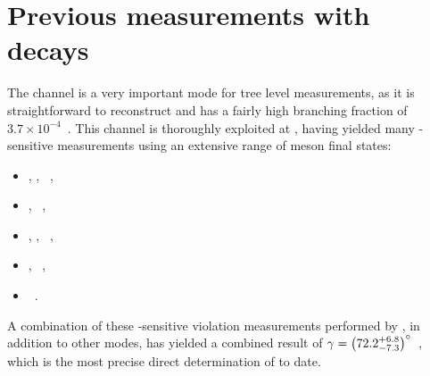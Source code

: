 \section{Previous \Pgamma measurements with  decays}


The \decay{\Bm}{\D\Km} channel is a very important mode for tree level \Pgamma measurements, as it is straightforward to reconstruct and has a fairly high branching fraction of $3.7 \times 10^{-4}$~\cite{PDG2016}. This \decay{\Bm}{\D\Km} channel is thoroughly exploited at \lhcb, having yielded many \Pgamma-sensitive measurements using an extensive range of \D meson final states:
\begin{itemize}
\item \decay{\D}{\Kp\pim}, \Kp\Km, \pip\pim~\cite{LHCb-PAPER-2017-021},
\item \decay{\D}{\Kp\pim\pip\pim}, \pip\pim\pip\pim~\cite{LHCb-PAPER-2016-003},
\item \decay{\D}{\Kp\pim\piz}, \Kp\Km\piz, \pip\pim\piz~\cite{LHCb-PAPER-2015-014},
\item \decay{\D}{\KS\Kp\Km}, \KS\pip\pim~\cite{LHCb-PAPER-2014-041},
\item \decay{\D}{\KS\Kp\pim}~\cite{LHCb-PAPER-2013-068}.
\end{itemize}
A combination of these \Pgamma-sensitive \CP violation measurements performed by \lhcb, in addition to other modes, has yielded a combined result of $\gamma = \left(72.2^{+6.8}_{-7.3}\right)^{\circ}$~\cite{LHCb-PAPER-2016-032}, which is the most precise direct determination of \Pgamma to date.


